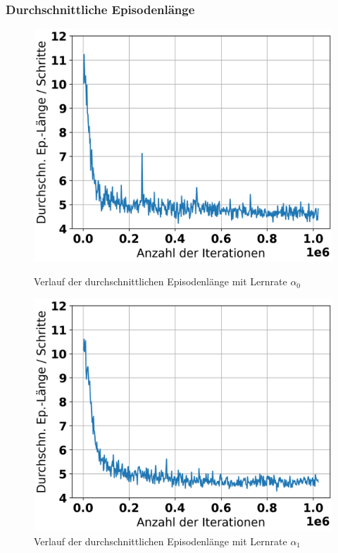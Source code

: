 \subsubsection{Durchschnittliche Episodenlänge}

\begin{figure}[H]
	\begin{minipage}[c]{0.48\linewidth}
		\includegraphics[width=\linewidth]{Bilder/random-training/history_random_0_003_graph_episode_lengths.png}
		\caption{Verlauf der durchschnittlichen Episodenlänge mit Lernrate $\alpha_0$}
	\end{minipage}
	\hfill
	\begin{minipage}[c]{0.48\linewidth}
		\includegraphics[width=\linewidth]{Bilder/random-training/history_random_0_001_graph_episode_lengths.png}
		\caption{Verlauf der durchschnittlichen Episodenlänge mit Lernrate $\alpha_1$}
	\end{minipage}
\end{figure}

